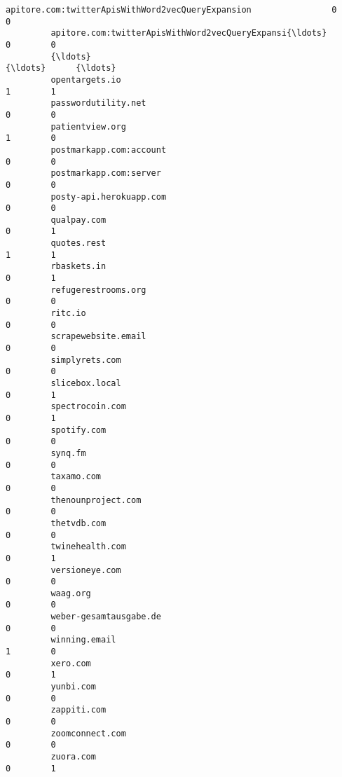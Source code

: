 \documentclass[11pt]{article}
\begin{document}
\begin{Verbatim}[commandchars=\\\{\}]
         apitore.com:twitterApisWithWord2vecQueryExpansion                0        0   
         apitore.com:twitterApisWithWord2vecQueryExpansi{\ldots}               0        0   
         {\ldots}                                                            {\ldots}      {\ldots}   
         opentargets.io                                                   1        1   
         passwordutility.net                                              0        0   
         patientview.org                                                  1        0   
         postmarkapp.com:account                                          0        0   
         postmarkapp.com:server                                           0        0   
         posty-api.herokuapp.com                                          0        0   
         qualpay.com                                                      0        1   
         quotes.rest                                                      1        1   
         rbaskets.in                                                      0        1   
         refugerestrooms.org                                              0        0   
         ritc.io                                                          0        0   
         scrapewebsite.email                                              0        0   
         simplyrets.com                                                   0        0   
         slicebox.local                                                   0        1   
         spectrocoin.com                                                  0        1   
         spotify.com                                                      0        0   
         synq.fm                                                          0        0   
         taxamo.com                                                       0        0   
         thenounproject.com                                               0        0   
         thetvdb.com                                                      0        0   
         twinehealth.com                                                  0        1   
         versioneye.com                                                   0        0   
         waag.org                                                         0        0   
         weber-gesamtausgabe.de                                           0        0   
         winning.email                                                    1        0   
         xero.com                                                         0        1   
         yunbi.com                                                        0        0   
         zappiti.com                                                      0        0   
         zoomconnect.com                                                  0        0   
         zuora.com                                                        0        1   
         

\end{Verbatim}
\end{document}
